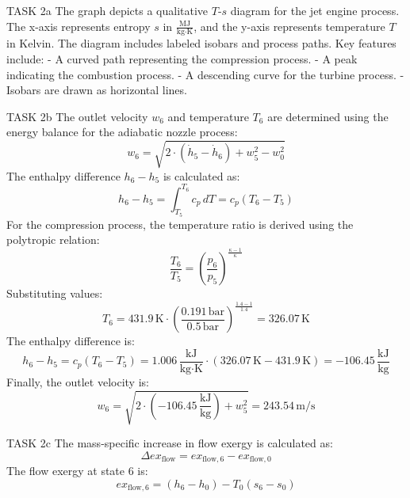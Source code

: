 TASK 2a  
The graph depicts a qualitative \( T \)-\( s \) diagram for the jet engine process. The x-axis represents entropy \( s \) in \( \frac{\text{MJ}}{\text{kg·K}} \), and the y-axis represents temperature \( T \) in Kelvin. The diagram includes labeled isobars and process paths. Key features include:  
- A curved path representing the compression process.  
- A peak indicating the combustion process.  
- A descending curve for the turbine process.  
- Isobars are drawn as horizontal lines.  

TASK 2b  
The outlet velocity \( w_6 \) and temperature \( T_6 \) are determined using the energy balance for the adiabatic nozzle process:  
\[
w_6 = \sqrt{2 \cdot (\dot{h}_5 - \dot{h}_6) + w_5^2 - w_0^2}
\]  
The enthalpy difference \( h_6 - h_5 \) is calculated as:  
\[
h_6 - h_5 = \int_{T_5}^{T_6} c_p \, dT = c_p (T_6 - T_5)
\]  
For the compression process, the temperature ratio is derived using the polytropic relation:  
\[
\frac{T_6}{T_5} = \left( \frac{p_6}{p_5} \right)^{\frac{\kappa - 1}{\kappa}}
\]  
Substituting values:  
\[
T_6 = 431.9 \, \text{K} \cdot \left( \frac{0.191 \, \text{bar}}{0.5 \, \text{bar}} \right)^{\frac{1.4 - 1}{1.4}} = 326.07 \, \text{K}
\]  
The enthalpy difference is:  
\[
h_6 - h_5 = c_p (T_6 - T_5) = 1.006 \, \frac{\text{kJ}}{\text{kg·K}} \cdot (326.07 \, \text{K} - 431.9 \, \text{K}) = -106.45 \, \frac{\text{kJ}}{\text{kg}}
\]  
Finally, the outlet velocity is:  
\[
w_6 = \sqrt{2 \cdot (-106.45 \, \frac{\text{kJ}}{\text{kg}}) + w_5^2} = 243.54 \, \text{m/s}
\]  

TASK 2c  
The mass-specific increase in flow exergy is calculated as:  
\[
\Delta ex_{\text{flow}} = ex_{\text{flow},6} - ex_{\text{flow},0}
\]  
The flow exergy at state 6 is:  
\[
ex_{\text{flow},6} = (h_6 - h_0) - T_0 (s_6 - s_0)
\]
